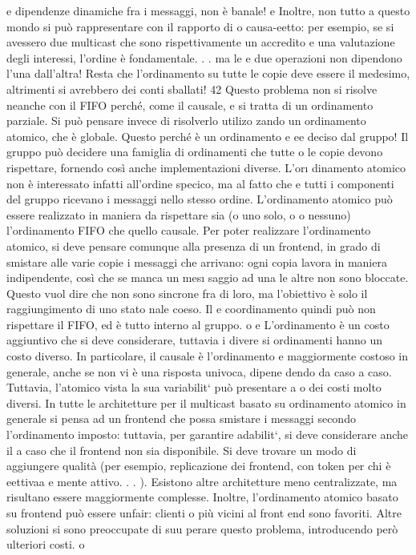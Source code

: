 \documentclass[a4paper,12pt]{article}
\begin{document}
e
dipendenze dinamiche fra i messaggi, non è banale!
e
Inoltre, non tutto a questo mondo si può rappresentare con il rapporto di
o
causa-eetto: per esempio, se si avessero due multicast che sono rispettivamente
un accredito e una valutazione degli interessi, l'ordine è fondamentale. . . ma le
e
due operazioni non dipendono l'una dall'altra! Resta che l'ordinamento su tutte
le copie deve essere il medesimo, altrimenti si avrebbero dei conti sballati!
42
Questo problema non si risolve neanche con il FIFO perché, come il causale,
e
si tratta di un ordinamento parziale. Si può pensare invece di risolverlo utilizo
zando un ordinamento atomico, che è globale. Questo perché è un ordinamento
e
ee
deciso dal gruppo! Il gruppo può decidere una famiglia di ordinamenti che tutte
o
le copie devono rispettare, fornendo così anche implementazioni diverse. L'or\i{}
dinamento atomico non è interessato infatti all'ordine specico, ma al fatto che
e
tutti i componenti del gruppo ricevano i messaggi nello stesso ordine. L'ordinamento atomico può essere realizzato in
maniera da rispettare sia (o uno solo, o
o
nessuno) l'ordinamento FIFO che quello causale.
Per poter realizzare l'ordinamento atomico, si deve pensare comunque alla
presenza di un frontend, in grado di smistare alle varie copie i messaggi che
arrivano: ogni copia lavora in maniera indipendente, così che se manca un mes\i{}
saggio ad una le altre non sono bloccate. Questo vuol dire che non sono sincrone
fra di loro, ma l'obiettivo è solo il raggiungimento di uno stato nale coeso. Il
e
coordinamento quindi può non rispettare il FIFO, ed è tutto interno al gruppo.
o
e
L'ordinamento è un costo aggiuntivo che si deve considerare, tuttavia i divere
si ordinamenti hanno un costo diverso. In particolare, il causale è l'ordinamento
e
maggiormente costoso in generale, anche se non vi è una risposta univoca, dipene
dendo da caso a caso. Tuttavia, l'atomico vista la sua variabilit` può presentare
a o
dei costi molto diversi.
In tutte le architetture per il multicast basato su ordinamento atomico in
generale si pensa ad un frontend che possa smistare i messaggi secondo l'ordinamento imposto: tuttavia, per garantire
adabilit`, si deve considerare anche il
a
caso che il frontend non sia disponibile. Si deve trovare un modo di aggiungere
qualità (per esempio, replicazione dei frontend, con token per chi è eettivaa
e
mente attivo. . . ). Esistono altre architetture meno centralizzate, ma risultano
essere maggiormente complesse.
Inoltre, l'ordinamento atomico basato su frontend può essere unfair: clienti
o
più vicini al front end sono favoriti. Altre soluzioni si sono preoccupate di suu
perare questo problema, introducendo però ulteriori costi.
o
\end{document}
